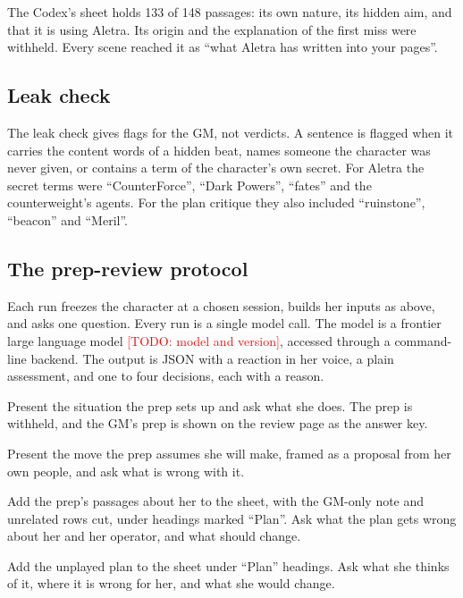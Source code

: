 \documentclass[11pt]{article}
\newcommand{\todo}[1]{\textcolor{red}{[TODO: #1]}}
\begin{document}
The Codex's sheet holds 133 of 148 passages: its own nature, its hidden aim, and that it is
using Aletra. Its origin and the explanation of the first miss were withheld. Every scene
reached it as ``what Aletra has written into your pages''.

\subsection{Leak check}

The leak check gives flags for the GM, not verdicts. A sentence is flagged when it carries
the content words of a hidden beat, names someone the character was never given, or
contains a term of the character's own secret. For Aletra the secret terms were
``CounterForce'', ``Dark Powers'', ``fates'' and the counterweight's agents. For the plan
critique they also included ``ruinstone'', ``beacon'' and ``Meril''.

\subsection{The prep-review protocol}
\label{sec:protocol}

Each run freezes the character at a chosen session, builds her inputs as above, and asks one
question. Every run is a single model call. The model is a frontier large language model
\todo{model and version}, accessed through a command-line backend. The output is JSON with
a reaction in her voice, a plain assessment, and one to four decisions, each with a reason.

\begin{description}[nosep]
\item[Predict.] Present the situation the prep sets up and ask what she does. The prep is
withheld, and the GM's prep is shown on the review page as the answer key.
\item[Critique.] Present the move the prep assumes she will make, framed as a proposal from
her own people, and ask what is wrong with it.
\item[Fix.] Add the prep's passages about her to the sheet, with the GM-only note and
unrelated rows cut, under headings marked ``Plan''. Ask what the plan gets wrong about her
and her operator, and what should change.
\item[Plan critique.] Add the unplayed plan to the sheet under ``Plan'' headings. Ask what
she thinks of it, where it is wrong for her, and what she would change.
\end{description}
\end{document}
